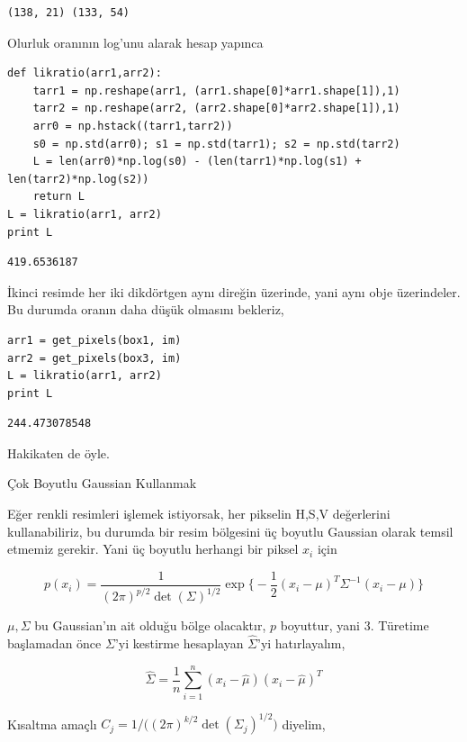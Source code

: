 \documentclass[12pt,fleqn]{article}\usepackage{../../common}
\begin{document}
\begin{verbatim}
(138, 21) (133, 54)
\end{verbatim}

Olurluk oranının log'unu alarak hesap yapınca

\begin{verbatim}
def likratio(arr1,arr2):
    tarr1 = np.reshape(arr1, (arr1.shape[0]*arr1.shape[1]),1)
    tarr2 = np.reshape(arr2, (arr2.shape[0]*arr2.shape[1]),1)
    arr0 = np.hstack((tarr1,tarr2))
    s0 = np.std(arr0); s1 = np.std(tarr1); s2 = np.std(tarr2)
    L = len(arr0)*np.log(s0) - (len(tarr1)*np.log(s1) + len(tarr2)*np.log(s2))
    return L
L = likratio(arr1, arr2)
print L
\end{verbatim}

\begin{verbatim}
419.6536187
\end{verbatim}

İkinci resimde her iki dikdörtgen aynı direğin üzerinde, yani aynı obje
üzerindeler. Bu durumda oranın daha düşük olmasını bekleriz,

\begin{verbatim}
arr1 = get_pixels(box1, im)
arr2 = get_pixels(box3, im)
L = likratio(arr1, arr2)
print L
\end{verbatim}

\begin{verbatim}
244.473078548
\end{verbatim}

Hakikaten de öyle.

Çok Boyutlu Gaussian Kullanmak

Eğer renkli resimleri işlemek istiyorsak, her pikselin H,S,V  değerlerini
kullanabiliriz, bu durumda bir resim bölgesini üç boyutlu Gaussian olarak temsil
etmemiz gerekir. Yani üç boyutlu herhangi bir piksel $x_i$ için

$$
p(x_i) =
\frac{1}{(2\pi)^{p/2} \det(\Sigma)^{1/2}} \exp 
\bigg\{  -\frac{1}{2}(x_i-\mu)^T\Sigma^{-1}(x_i-\mu) \bigg\}
$$

$\mu,\Sigma$ bu Gaussian'ın ait olduğu bölge olacaktır, $p$ boyuttur, yani
3. Türetime başlamadan önce $\Sigma$'yi kestirme hesaplayan $\hat{\Sigma}$'yi
hatırlayalım,

$$ \hat{\Sigma} = \frac{1}{n} \sum _{i=1}^{n} (x_i-\hat{\mu}) (x_i-\hat{\mu})^T $$

Kısaltma amaçlı $C_j = 1 / \big((2\pi)^{k/2} \det(\Sigma_j)^{1/2}\big)$ diyelim, 
\end{document}
